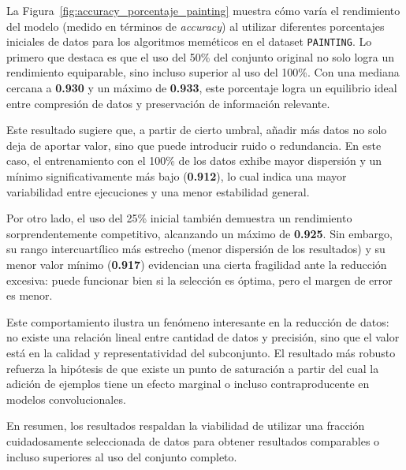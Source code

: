 La Figura~\ref{fig:accuracy_porcentaje_painting} muestra cómo varía el rendimiento del modelo (medido en términos de \textit{accuracy})
al utilizar diferentes porcentajes iniciales de datos para los algoritmos meméticos en el dataset \texttt{PAINTING}.
Lo primero que destaca es que el uso del 50\% del conjunto original no solo logra un rendimiento equiparable, sino incluso superior al uso del 100\%.
Con una mediana cercana a \textbf{0.930} y un máximo de \textbf{0.933}, este porcentaje logra un equilibrio ideal entre compresión de datos y preservación de información relevante.

Este resultado sugiere que, a partir de cierto umbral, añadir más datos no solo deja de aportar valor, sino que puede introducir ruido o redundancia.
En este caso, el entrenamiento con el 100\% de los datos exhibe mayor dispersión y un mínimo significativamente más bajo (\textbf{0.912}),
lo cual indica una mayor variabilidad entre ejecuciones y una menor estabilidad general.

Por otro lado, el uso del 25\% inicial también demuestra un rendimiento sorprendentemente competitivo,
alcanzando un máximo de \textbf{0.925}.
Sin embargo, su rango intercuartílico más estrecho (menor dispersión de los resultados) y su menor valor mínimo
(\textbf{0.917}) evidencian una cierta fragilidad ante la reducción excesiva:
puede funcionar bien si la selección es óptima, pero el margen de error es menor.

Este comportamiento ilustra un fenómeno interesante en la reducción de datos: no existe una relación lineal entre cantidad de datos y precisión,
sino que el valor está en la calidad y representatividad del subconjunto.
El resultado más robusto refuerza la hipótesis de que existe un punto de saturación
a partir del cual la adición de ejemplos tiene un efecto marginal o incluso contraproducente en modelos convolucionales.

En resumen, los resultados respaldan la viabilidad de utilizar una fracción cuidadosamente seleccionada de datos para obtener
resultados comparables o incluso superiores al uso del conjunto completo.

